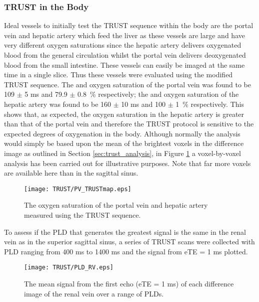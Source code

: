 \subsubsection{\ac{TRUST} in the Body}

Ideal vessels to initially test the \ac{TRUST} sequence within the body are the portal vein and hepatic artery which feed the liver as these vessels are large and have very different oxygen saturations since the hepatic artery delivers oxygenated blood from the general circulation whilst the portal vein delivers deoxygenated blood from the small intestine. These vessels can easily be imaged at the same time in a single slice. Thus these vessels were evaluated using the modified \ac{TRUST} sequence. The \ttwo and oxygen saturation of the portal vein was found to be 109 $\pm$ 5 ms and 79.9 $\pm$ 0.8~\% respectively; the \ttwo and oxygen saturation of the hepatic artery was found to be 160 $\pm$ 10 ms and 100 $\pm$ 1~\% respectively. This shows that, as expected, the oxygen saturation in the hepatic artery is greater than that of the portal vein and therefore the \ac{TRUST} protocol is sensitive to the expected degrees of oxygenation in the body. Although normally the analysis would simply be based upon the mean of the brightest voxels in the difference image as outlined in Section \ref{sec:trust_analysis}, in Figure \ref{fig:pv_TRUST} a voxel-by-voxel analysis has been carried out for illustrative purposes. Note that far more voxels are available here than in the sagittal sinus.

\begin{figure}[h]
	\centering
	\texttt{[image: TRUST/PV\_TRUSTmap.eps]}
	\caption{The oxygen saturation of the portal vein and hepatic artery measured using the \ac{TRUST} sequence.}
	\label{fig:pv_TRUST}	
\end{figure}
To assess if the \ac{PLD} that generates the greatest signal is the same in the renal vein as in the superior sagittal sinus, a series of \ac{TRUST} scans were collected with \ac{PLD} ranging from 400 ms to 1400 ms and the signal from \ac{eTE} = 1 ms plotted.

\begin{figure}[H]
	\centering
	\texttt{[image: TRUST/PLD\_RV.eps]}
	\caption{The mean signal from the first echo (\ac{eTE} = 1 ms) of each difference image of the renal vein over a range of \acp{PLD}.}
	\label{fig:Sig_vs_PLD_RV}
\end{figure}

